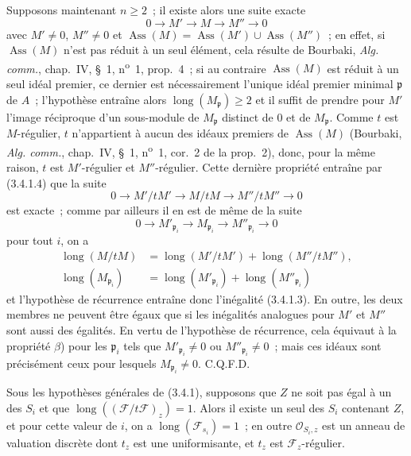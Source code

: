 Supposons maintenant $n\geqslant2$~; il existe alors une suite exacte
\[
0\longrightarrow M'\longrightarrow M\longrightarrow M''\longrightarrow0
\]
avec $M'\neq0$, $M''\neq0$ et
$\operatorname{Ass}(M)=\operatorname{Ass}(M')\cup\operatorname{Ass}(M'')$~;
en effet, si $\operatorname{Ass}(M)$ n'est pas réduit à un seul élément, cela
résulte de Bourbaki, \emph{Alg. comm.}, chap.~IV, \S~1,
n\textsuperscript{o}~1, prop.~4~; si au contraire $\operatorname{Ass}(M)$ est
réduit à un seul idéal premier, ce dernier est nécessairement l'unique idéal
premier minimal $\mathfrak p$ de $A$~; l'hypothèse entraîne alors
$\operatorname{long}(M_{\mathfrak p})\geqslant2$ et il suffit de prendre pour
$M'$ l'image réciproque d'un sous-module de $M_{\mathfrak p}$ distinct de $0$
et de $M_{\mathfrak p}$. Comme $t$ est $M$-régulier, $t$ n'appartient à aucun
des idéaux premiers de $\operatorname{Ass}(M)$ (Bourbaki,
\emph{Alg. comm.}, chap.~IV, \S~1, n\textsuperscript{o}~1, cor.~2 de la
prop.~2), donc, pour la même raison, $t$ est $M'$-régulier et
$M''$-régulier. Cette dernière propriété entraîne par (3.4.1.4) que la suite
\[
0\longrightarrow M'/tM'\longrightarrow M/tM
\longrightarrow M''/tM''\longrightarrow0
\]
est exacte~; comme par ailleurs il en est de même de la suite
\[
0\longrightarrow M'_{\mathfrak p_i}\longrightarrow M_{\mathfrak p_i}
\longrightarrow M''_{\mathfrak p_i}\longrightarrow0
\]
pour tout $i$, on a
\[
\begin{aligned}
\operatorname{long}(M/tM)
&=\operatorname{long}(M'/tM')+\operatorname{long}(M''/tM''),\\
\operatorname{long}(M_{\mathfrak p_i})
&=\operatorname{long}(M'_{\mathfrak p_i})
 +\operatorname{long}(M''_{\mathfrak p_i})
\end{aligned}
\]
et l'hypothèse de récurrence entraîne donc l'inégalité (3.4.1.3). En outre,
les deux membres ne peuvent être égaux que si les inégalités analogues pour
$M'$ et $M''$ sont aussi des égalités. En vertu de l'hypothèse de récurrence,
cela équivaut à la propriété $\beta$) pour les $\mathfrak p_i$ tels que
$M'_{\mathfrak p_i}\neq0$ ou $M''_{\mathfrak p_i}\neq0$~; mais ces idéaux sont
précisément ceux pour lesquels $M_{\mathfrak p_i}\neq0$. C.Q.F.D.


\begin{corollary}[3.4.2]
\label{IV.2.3.4.2-fr}
Sous les hypothèses générales de (3.4.1), supposons que $Z$ ne soit pas égal
à un des $S_i$ et que
$\operatorname{long}((\mathcal F/t\mathcal F)_z)=1$. Alors il existe un seul
des $S_i$ contenant $Z$, et pour cette valeur de $i$, on a
$\operatorname{long}(\mathcal F_{s_i})=1$~; en outre
$\mathcal O_{S_i,z}$ est un anneau de valuation discrète dont $t_z$ est une
uniformisante, et $t_z$ est $\mathcal F_z$-régulier.
\end{corollary}

